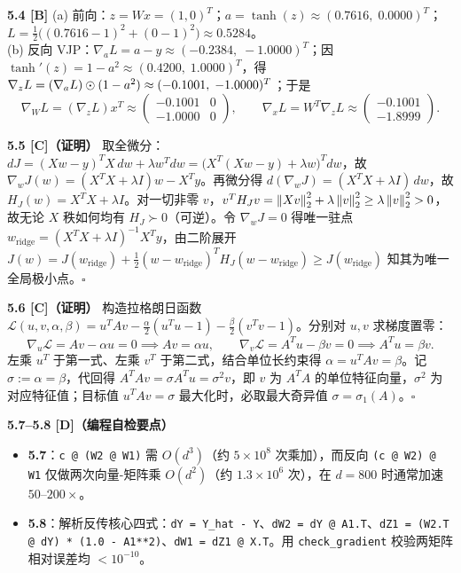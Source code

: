 \textbf{5.4 [B]}
(a) 前向：$z = Wx = (1, 0)^T$；$a = \tanh(z) \approx (0.7616,\; 0.0000)^T$；$L = \frac{1}{2}\big((0.7616-1)^2 + (0-1)^2\big) \approx 0.5284$。\\
(b) 反向 VJP：$\nabla_a L = a - y \approx (-0.2384,\; -1.0000)^T$；因 $\tanh'(z)=1-a^2 \approx (0.4200,\; 1.0000)^T$，得 $\nabla_z L = (\nabla_a L)\odot(1-a^2) \approx (-0.1001,\; -1.0000)^T$；于是
\[
  \nabla_W L = (\nabla_z L) x^T \approx \begin{pmatrix}-0.1001 & 0\\ -1.0000 & 0\end{pmatrix},\qquad
  \nabla_x L = W^T \nabla_z L \approx \begin{pmatrix}-0.1001\\ -1.8999\end{pmatrix}.
\]

\textbf{5.5 [C]（证明）}
取全微分：$dJ = (Xw-y)^T X\,dw + \lambda w^T dw = \big(X^T(Xw-y) + \lambda w\big)^T dw$，故 $\nabla_w J(w) = (X^TX + \lambda I)w - X^Ty$。再微分得 $d(\nabla_w J) = (X^TX + \lambda I)\,dw$，故 $H_J(w) = X^TX + \lambda I$。对一切非零 $v$，$v^T H_J v = \left\|Xv\right\|_2^2 + \lambda\left\|v\right\|_2^2 \ge \lambda\left\|v\right\|_2^2 > 0$，故无论 $X$ 秩如何均有 $H_J \succ 0$（可逆）。令 $\nabla_w J = 0$ 得唯一驻点 $w_{\text{ridge}} = (X^TX+\lambda I)^{-1}X^Ty$，由二阶展开 $J(w) = J(w_{\text{ridge}}) + \frac{1}{2}(w-w_{\text{ridge}})^T H_J (w-w_{\text{ridge}}) \ge J(w_{\text{ridge}})$ 知其为唯一全局极小点。$\square$

\textbf{5.6 [C]（证明）}
构造拉格朗日函数 $\mathcal{L}(u, v, \alpha, \beta) = u^T A v - \frac{\alpha}{2}(u^T u - 1) - \frac{\beta}{2}(v^T v - 1)$。分别对 $u, v$ 求梯度置零：
\[
  \nabla_u \mathcal{L} = Av - \alpha u = 0 \implies Av = \alpha u,\qquad
  \nabla_v \mathcal{L} = A^T u - \beta v = 0 \implies A^T u = \beta v.
\]
左乘 $u^T$ 于第一式、左乘 $v^T$ 于第二式，结合单位长约束得 $\alpha = u^T A v = \beta$。记 $\sigma := \alpha = \beta$，代回得 $A^T A v = \sigma A^T u = \sigma^2 v$，即 $v$ 为 $A^T A$ 的单位特征向量，$\sigma^2$ 为对应特征值；目标值 $u^T A v = \sigma$ 最大化时，必取最大奇异值 $\sigma = \sigma_1(A)$。$\square$

\textbf{5.7--5.8 [D]（编程自检要点）}
\begin{itemize}
  \item \textbf{5.7}：\texttt{c @ (W2 @ W1)} 需 $O(d^3)$（约 $5\times 10^8$ 次乘加），而反向 \texttt{(c @ W2) @ W1} 仅做两次向量-矩阵乘 $O(d^2)$（约 $1.3\times 10^6$ 次），在 $d=800$ 时通常加速 $50\text{--}200\times$。
  \item \textbf{5.8}：解析反传核心四式：\texttt{dY = Y\_hat - Y}、\texttt{dW2 = dY @ A1.T}、\texttt{dZ1 = (W2.T @ dY) * (1.0 - A1**2)}、\texttt{dW1 = dZ1 @ X.T}。用 \texttt{check\_gradient} 校验两矩阵相对误差均 $<10^{-10}$。
\end{itemize}

